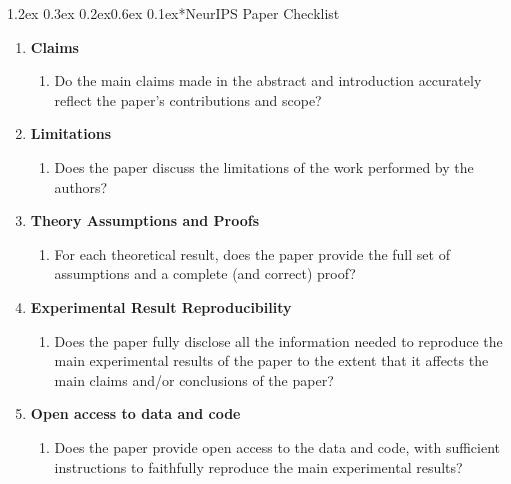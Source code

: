\documentclass{article}
\makeatletter
\renewcommand{\section}{\@startsection{section}{1}{\z@}%
  {1.2ex \@plus 0.3ex \@minus 0.2ex}{0.6ex \@plus 0.1ex}{\large\bf}}
\makeatother
\begin{document}



\newpage
\section*{NeurIPS Paper Checklist}

\begin{enumerate}
\item {\bf Claims}
    \begin{enumerate}
        \item Do the main claims made in the abstract and introduction accurately reflect the paper's contributions and scope? 
    \end{enumerate}

\item {\bf Limitations}
    \begin{enumerate}
        \item Does the paper discuss the limitations of the work performed by the authors? 
    \end{enumerate}

\item {\bf Theory Assumptions and Proofs}
    \begin{enumerate}
        \item For each theoretical result, does the paper provide the full set of assumptions and a complete (and correct) proof? 
    \end{enumerate}

\item {\bf Experimental Result Reproducibility}
    \begin{enumerate}
        \item Does the paper fully disclose all the information needed to reproduce the main experimental results of the paper to the extent that it affects the main claims and/or conclusions of the paper? 
    \end{enumerate}

\item {\bf Open access to data and code}
    \begin{enumerate}
        \item Does the paper provide open access to the data and code, with sufficient instructions to faithfully reproduce the main experimental results? 
    \end{enumerate}


\end{enumerate}
\end{document}
